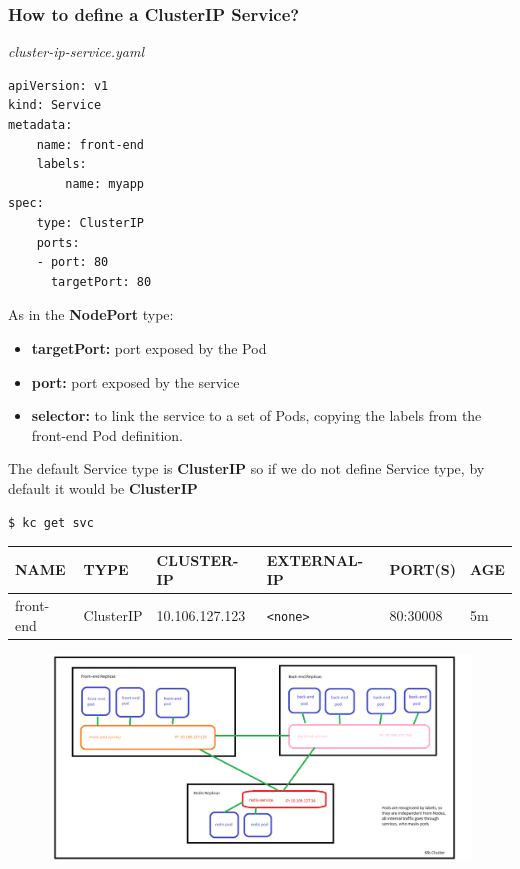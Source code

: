 \documentclass{article}
\newenvironment{blocktemplateI}[1]{%
    \tcolorbox[beamer,%
    noparskip,breakable,
    colframe=Violet,%
    colbacklower=Black,%
    title=#1]}%
    {\endtcolorbox}
\newenvironment{codetemplate}[1][]{%
  \mybasecolorbox[#1]
  \itshape
}{%
  \endmybasecolorbox
}
\begin{document}
\subsubsection{How to define a ClusterIP Service?}

\begin{codetemplate}{cluster-ip-service.yaml}
\begin{verbatim}
apiVersion: v1
kind: Service
metadata:
    name: front-end
    labels:
        name: myapp
spec:
    type: ClusterIP
    ports:
    - port: 80
      targetPort: 80
\end{verbatim}
\end{codetemplate}

As in the \textbf{NodePort} type:
\begin{itemize}
    \item \textbf{targetPort:} port exposed by the Pod
    \item \textbf{port:} port exposed by the service
    \item \textbf{selector:} to link the service to a set of Pods, copying the labels from the front-end Pod definition.
\end{itemize}

\begin{blocktemplateI}{NOTE}
The default Service type is \textbf{ClusterIP} so if we do not define Service type, by default it would be \textbf{ClusterIP}
\end{blocktemplateI}

\begin{codetemplate}{}
\begin{verbatim}
$ kc get svc
\end{verbatim}
\end{codetemplate}

\begin{table}[H]
\begin{tabular}{| m{3cm} | m{2cm} | m{2.5cm} | m{2.7cm} | m{2cm} | m{1.2cm} |}
\hline
\textbf{NAME} & \textbf{TYPE} & \textbf{CLUSTER-IP} & \textbf{EXTERNAL-IP} & \textbf{PORT(S)} & \textbf{AGE} \\ \hline
front-end & ClusterIP & 10.106.127.123 & \verb|<none>| & 80:30008 & 5m \\ \hline
\end{tabular}
\end{table}

\begin{figure}[H]
    \centering
    \includegraphics[width=\textwidth]{pictures/services4.png}
\end{figure}
\end{document}
